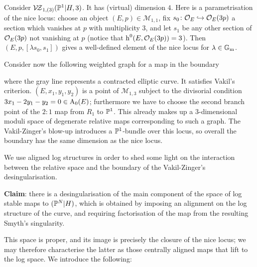 \begin{example}
Consider $\mathcal{V\!Z}_{1,(3)}(\mathbb P^1|H,3)$. It has (virtual) dimension $4$. Here is a parametrisation of the nice locus: choose an object $(E,p) \in \mathcal{M}_{1,1}$, fix $s_0 \colon\mathcal{O}_E\hookrightarrow\mathcal{O}_E(3p)$ a section which vanishes at $p$ with multiplicity $3$, and let $s_1$ be any other section of $\mathcal{O}_E(3p)$ not vanishing at $p$ (notice that $\operatorname{h}^0(E,\mathcal{O}_E(3p))=3$). Then $(E,p,[\lambda s_0,s_1])$ gives a well-defined element of the nice locus for $\lambda \in \mathbb{G}_{\text{m}}$.

Consider now the following weighted graph for a map in the boundary
\begin{center}
\end{center}
where the gray line represents a contracted elliptic curve. It satisfies Vakil's criterion. $(E,x_1,y_1,y_2)$ is a point of $\mathcal{M}_{1,3}$ subject to the divisorial condition $3x_1-2y_1-y_2=0\in \operatorname{A}_0(E)$; furthermore we have to choose the second branch point of the $2:1$ map from $R_1$ to $\mathbb P^1$. This already makes up a $3$-dimensional moduli space of degenerate relative maps corresponding to such a graph. The Vakil-Zinger's blow-up introduces a $\mathbb P^1$-bundle over this locus, so overall the boundary has the same dimension as the nice locus.
\end{example}
We use aligned log structures in order to shed some light on the interaction between the relative space and the boundary of the Vakil-Zinger's desingularisation.

\textbf{Claim}: there is a desingularisation of the main component of the space of log stable maps to $(\mathbb P^N|H)$, which is obtained by imposing an alignment on the log structure of the curve, and requiring factorisation of the map from the resulting Smyth's singularity.

This space is proper, and its image is precisely the closure of the nice locus; we may therefore characterise the latter as those centrally aligned maps that lift to the log space. We introduce the following:

